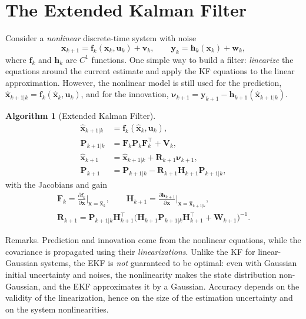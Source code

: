 \documentclass[11pt,a4paper]{article}
\newcommand{\hx}{\hat{\boldsymbol{x}}}
\newcommand{\bx}{\boldsymbol{x}}
\newcommand{\bu}{\boldsymbol{u}}
\newcommand{\by}{\boldsymbol{y}}
\newcommand{\bv}{\boldsymbol{v}}
\newcommand{\bw}{\boldsymbol{w}}
\newcommand{\bnu}{\boldsymbol{\nu}}
\newcommand{\mF}{\mathbf{F}}
\newcommand{\mH}{\mathbf{H}}
\newcommand{\mP}{\mathbf{P}}
\newcommand{\mR}{\mathbf{R}}
\newcommand{\mV}{\mathbf{V}}
\newcommand{\mW}{\mathbf{W}}
\newcommand{\tp}{^{\top}}
\newcommand{\slides}[1]{\texorpdfstring{\hspace{0.5em}{\normalfont\small\emph{(#1)}}}{}}
\theoremstyle{plain}
\theoremstyle{definition}
\newtheorem{algorithm}[theorem]{Algorithm}
\theoremstyle{remark}
\begin{document}
\section{The Extended Kalman Filter \slides{EKF deck, slides 22--24}}

Consider a \emph{nonlinear} discrete-time system with noise
\begin{equation}\label{eq:nl}
\bx_{k+1}=\boldsymbol f_k(\bx_k,\bu_k)+\bv_k,\qquad \by_k=\boldsymbol h_k(\bx_k)+\bw_k,
\end{equation}
where $\boldsymbol f_k$ and $\boldsymbol h_k$ are $C^1$ functions. One simple way to build a filter: \emph{linearize} the equations
around the current estimate and apply the KF equations to the linear approximation. However, the nonlinear model is still used for
the prediction, $\hx_{k+1|k}=\boldsymbol f_k(\hx_k,\bu_k)$, and for the innovation, $\bnu_{k+1}=\by_{k+1}-\boldsymbol h_{k+1}(\hx_{k+1|k})$.

\begin{algorithm}[Extended Kalman Filter]\label{alg:ekf}
\begin{align}
\hx_{k+1|k}&=\boldsymbol f_k(\hx_k,\bu_k),\nonumber\\
\mP_{k+1|k}&=\mF_k\mP_k\mF_k\tp+\mV_k,\nonumber\\
\hx_{k+1}&=\hx_{k+1|k}+\mR_{k+1}\bnu_{k+1},\label{eq:ekf}\\
\mP_{k+1}&=\mP_{k+1|k}-\mR_{k+1}\mH_{k+1}\mP_{k+1|k},\nonumber
\end{align}
with the Jacobians and gain
\begin{gather*}
\mF_k=\frac{\partial\boldsymbol f_k}{\partial\bx}\Big|_{\bx=\hx_k},\qquad
\mH_{k+1}=\frac{\partial\boldsymbol h_{k+1}}{\partial\bx}\Big|_{\bx=\hx_{k+1|k}},\\
\mR_{k+1}=\mP_{k+1|k}\mH_{k+1}\tp\big(\mH_{k+1}\mP_{k+1|k}\mH_{k+1}\tp+\mW_{k+1}\big)^{-1}.
\end{gather*}
\end{algorithm}

Remarks. Prediction and innovation come from the nonlinear equations, while the covariance is propagated using their
\emph{linearizations}. Unlike the KF for linear-Gaussian systems, the EKF is \emph{not} guaranteed to be optimal: even with Gaussian
initial uncertainty and noises, the nonlinearity makes the state distribution non-Gaussian, and the EKF approximates it by a Gaussian.
Accuracy depends on the validity of the linearization, hence on the size of the estimation uncertainty and on the system nonlinearities.
\end{document}

